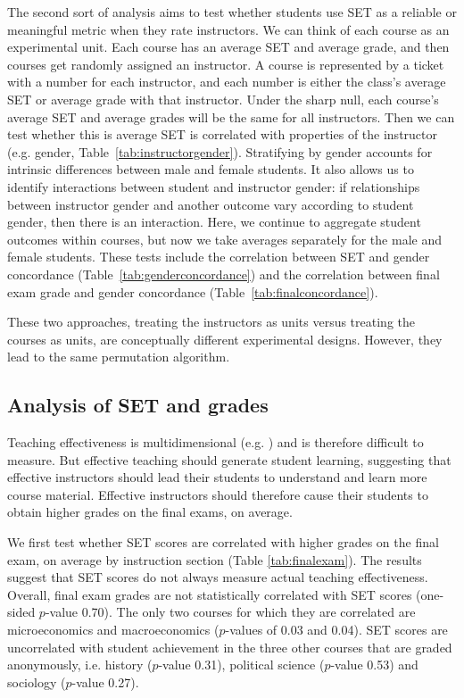\documentclass[12pt]{article}
\begin{document}
The second sort of analysis aims to test whether students use SET as a reliable or meaningful metric when they rate instructors.  We can think of each course as an experimental unit.  
Each course has an average SET and average grade, and then courses get randomly assigned an instructor.  
A course is represented by a ticket with a number for each instructor, and each number is either the class's average SET or average grade with that instructor.  
Under the sharp null, each course's average SET and average grades will be the same for all instructors.  
Then we can test whether this is average SET is correlated with properties of the instructor (e.g. gender, Table~\ref{tab:instructorgender}).  
Stratifying by gender accounts for intrinsic differences between male and female students.  
It also allows us to identify interactions between student and instructor gender: if relationships between instructor gender and another outcome vary according to student gender, then there is an interaction.  
Here, we continue to aggregate student outcomes within courses, but now we take averages separately for the male and female students.  
These tests include the correlation between SET and gender concordance (Table~\ref{tab:genderconcordance}) and the correlation between final exam grade and gender concordance (Table~\ref{tab:finalconcordance}).

These two approaches, treating the instructors as units versus treating the courses as units, are conceptually different experimental designs.  However, they lead to the same permutation algorithm.


\subsection{Analysis of SET and grades}

Teaching effectiveness is multidimensional (e.g. \citet{Marsh1997}) and is therefore difficult to measure. But effective teaching should generate student learning, suggesting that effective instructors should lead their students to understand and learn more course material. Effective instructors should therefore cause their students to obtain higher grades on the final exams, on average. 

We first test whether SET scores are correlated with higher grades on the final exam, on average by instruction section (Table \ref{tab:finalexam}). The results suggest that SET scores do not always measure actual teaching effectiveness. Overall, final exam grades are not statistically correlated with SET scores (one-sided $p$-value 0.70). The only two courses for which they are correlated are microeconomics and macroeconomics ($p$-values of 0.03 and 0.04). SET scores are uncorrelated with student achievement in the three other courses that are graded anonymously, i.e. history ($p$-value 0.31), political science ($p$-value 0.53) and sociology ($p$-value 0.27). 
\end{document}

